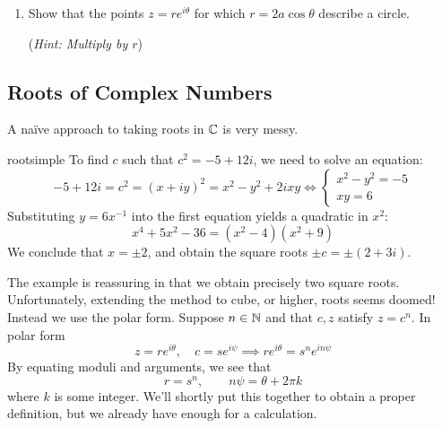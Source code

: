 \begin{exercises}
\begin{enumerate}
\begin{enumerate}
	    \item Show that the points $z=re^{i\theta}$ for which $r=2a\cos\theta$ describe a circle.\par
	    (\emph{Hint: Multiply by $r$})	
		\end{enumerate}
	\end{enumerate}
\end{exercises}

\clearpage



\subsection{Roots of Complex Numbers}\label{sec:roots}%

A naïve approach to taking roots in $\mathbb{C}$ is very messy.

\begin{example}{}{rootsimple}
	To find $c$ such that $c^2=-5+12i$, we need to solve an equation:
	\[
		-5+12i=c^2=(x+iy)^2=x^2-y^2+2ixy\iff 
		\begin{cases}
			x^2-y^2=-5\\
			xy=6
		\end{cases}
	\]
	Substituting $y=6x^{-1}$ into the first equation yields a quadratic in $x^2$:
	\[
		x^4+5x^2-36=(x^2-4)(x^2+9)
	\]
	We conclude that $x=\pm 2$, and obtain the square roots $\pm c=\pm(2+3i)$.
\end{example}

The example is reassuring in that we obtain precisely two square roots. Unfortunately, extending the method to cube, or higher, roots seems doomed! Instead we use the polar form. Suppose $n\in\mathbb{N}$ and that $c,z$ satisfy $z=c^n$. In polar form
\[
	z=re^{i\theta},\quad c=se^{i\psi}\implies re^{i\theta}=s^ne^{in\psi}
\]
By equating moduli and arguments, we see that
\[
	r=s^n,\qquad n\psi=\theta+2\pi k\tag{$\ast$}
\]
where $k$ is some integer. We'll shortly put this together to obtain a proper definition, but we already have enough for a calculation.

